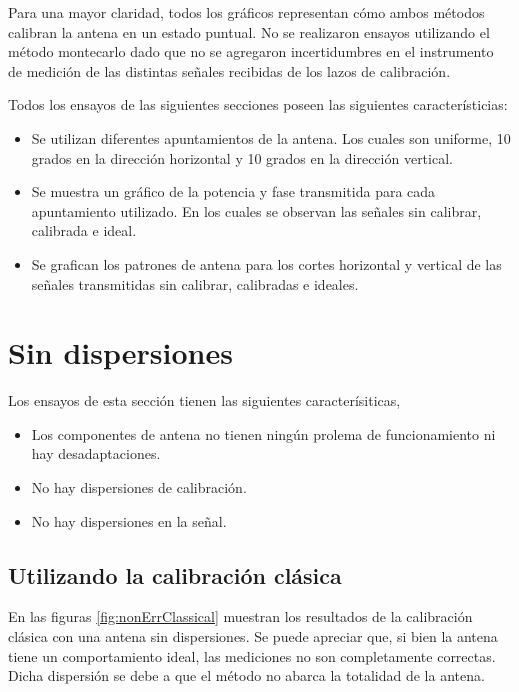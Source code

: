 Para una mayor claridad, todos los gráficos representan cómo ambos métodos calibran la antena en un estado puntual. No se 
realizaron ensayos utilizando el método montecarlo dado que no se agregaron incertidumbres en el instrumento de medición de las 
distintas señales recibidas de los lazos de calibración.

Todos los ensayos de las siguientes secciones poseen las siguientes característicias:
\begin{itemize}
	\item Se utilizan diferentes apuntamientos de la antena. Los cuales son uniforme, 10 grados en la dirección horizontal y 10 
		grados en la dirección vertical.
	\item Se muestra un gráfico de la potencia y fase transmitida para cada apuntamiento utilizado. En los cuales se observan las
		señales sin calibrar, calibrada e ideal. 
	\item Se grafican los patrones de antena para los cortes horizontal y vertical de las señales transmitidas sin calibrar, 
		calibradas e ideales.
\end{itemize}


\section{Sin dispersiones}

Los ensayos de esta sección tienen las siguientes caracterísiticas,
\begin{itemize}
	\item Los componentes de antena no tienen ningún prolema de funcionamiento ni hay desadaptaciones.
	\item No hay dispersiones de calibración.
	\item No hay dispersiones en la señal.
\end{itemize}

\subsection{Utilizando la calibración clásica}

En las figuras \ref{fig:nonErrClassical} muestran los resultados de la calibración clásica con una antena sin dispersiones. 
Se puede apreciar que, si bien la antena tiene un comportamiento ideal, las mediciones no son completamente correctas. Dicha 
dispersión se debe a que el método no abarca la totalidad de la antena.

